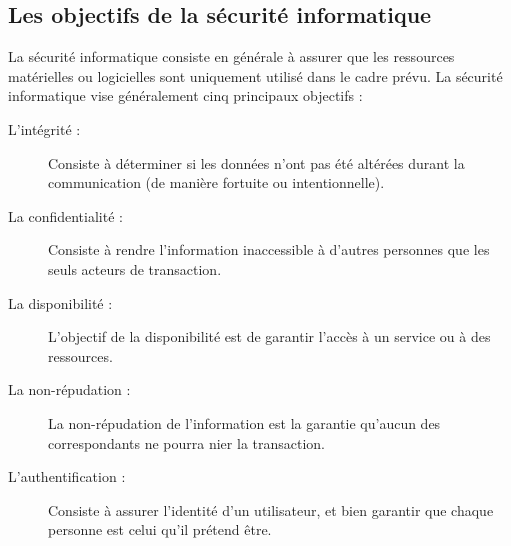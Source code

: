     \subsection{Les objectifs de la sécurité informatique}
    La sécurité informatique consiste en générale à assurer que les ressources matérielles ou logicielles sont 
    uniquement utilisé dans le cadre prévu. La sécurité informatique vise généralement cinq principaux objectifs :
    \begin{description}
        \item[L'intégrité :] Consiste à déterminer si les données n'ont pas été altérées durant la communication 
            (de manière fortuite ou intentionnelle).
        \item[La confidentialité :] Consiste à rendre l'information inaccessible à d'autres personnes que les 
            seuls acteurs de transaction.
        \item[La disponibilité :] L'objectif de la disponibilité est de garantir l'accès à un service 
            ou à des ressources.
        \item[La non-répudation :] La non-répudation de l'information est la garantie qu'aucun des correspondants 
            ne pourra nier la transaction.
        \item[L'authentification :] Consiste à assurer l'identité d'un utilisateur, et bien garantir que chaque
            personne est celui qu'il prétend être.
    \end{description}

